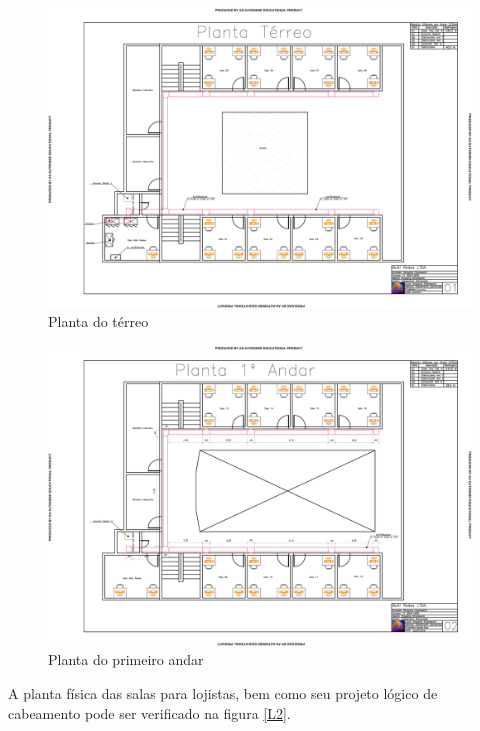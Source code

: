 \documentclass[	DIV=calc,%
							paper=a4,%
							fontsize=12pt,%
							onecolumn]{scrartcl}	 					%
\begin{document}
\begin{figure}
\centering
\includegraphics[width=\textwidth]{L1}
\caption{Planta do térreo}
\label{L1}
\end{figure}

\begin{figure}
\centering
\includegraphics[width=\textwidth]{L3}
\caption{Planta do primeiro andar}
\label{L3}
\end{figure}

A planta física das salas para lojistas, bem como seu projeto lógico de cabeamento pode ser verificado na figura \ref{L2}.
\end{document}

